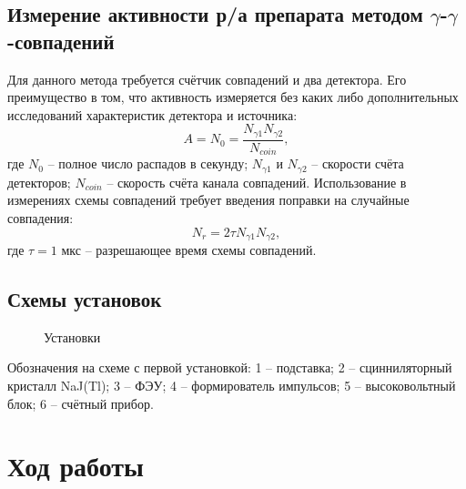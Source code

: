 \documentclass[12pt,a4paper]{article}
\begin{document}
	\subsection{Измерение активности р/а препарата методом $\gamma$-$\gamma$-совпадений}
	Для данного метода требуется счётчик совпадений и два детектора. Его преимущество в том, что активность измеряется без каких либо дополнительных исследований характеристик детектора и источника:
	\begin{equation} \label{eq:4}
		A = N_0 = \frac{N_{\gamma1} N_{\gamma2}}{N_{coin}},
	\end{equation}
	где $N_0$ -- полное число распадов в секунду; $N_{\gamma1}$ и $N_{\gamma2}$ -- скорости счёта детекторов; $N_{coin}$ -- скорость счёта канала совпадений. Использование в измерениях схемы совпадений требует введения поправки на случайные совпадения:
	\begin{equation} \label{eq:5}
		N_{r} = 2 \tau N_{\gamma1} N_{\gamma2},
	\end{equation}
	где $\tau = 1$ мкс -- разрешающее время схемы совпадений.

	\subsection{Схемы установок}
	\begin{figure}[H]
  		\centering
  		\caption{\label{fig:Sch}Установки}
	\end{figure}
	Обозначения на схеме с первой установкой: 1 -- подставка; 2 -- сцинниляторный кристалл NaJ(Tl); 3 -- ФЭУ; 4 -- формирователь импульсов; 5 -- высоковольтный блок; 6 -- счётный прибор.
	\section{Ход работы}
\end{document}
